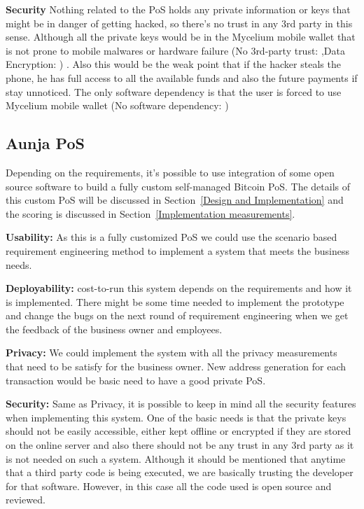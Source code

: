  \textbf{Security}
Nothing related to the PoS holds any private information or keys that might be in danger of getting hacked, so there's no trust in any 3rd party in this sense. Although all the private keys would be in the Mycelium mobile wallet that is not prone to mobile malwares or hardware failure (No 3rd-party trust: \prt ,Data Encryption: \prt) . Also this would be the weak point that if the hacker steals the phone, he has full access to all the available funds and also the future payments if stay unnoticed. The only software dependency is that the user is forced to use Mycelium mobile wallet (No software dependency: \prt)

\subsection{Aunja PoS}
Depending on the requirements, it's possible to use integration of some open source software to build a fully custom self-managed Bitcoin PoS. The details of this custom PoS will be discussed in Section~\ref{Design and Implementation} and the scoring is discussed in Section~\ref{Implementation measurements}.

 \textbf{Usability:}
As this is a fully customized PoS we could use the scenario based requirement engineering method to implement a system that meets the business needs.

 \textbf{Deployability:}
cost-to-run this system depends on the requirements and how it is implemented. There might be some time needed to implement the prototype and change the bugs on the next round of requirement engineering when we get the feedback of the business owner and employees.

 \textbf{Privacy:}
We could implement the system with all the privacy measurements that need to be satisfy for the business owner. New address generation for each transaction would be basic need to have a good private PoS.

 \textbf{Security:}
Same as Privacy, it is possible to keep in mind all the security features when implementing this system. One of the basic needs is that the private keys should not be easily accessible, either kept offline or encrypted if they are stored on the online server and also there should not be any trust in any 3rd party as it is not needed on such a system. Although it should be mentioned that anytime that a third party code is being executed, we are basically trusting the developer for that software. However, in this case all the code used is open source and reviewed.


